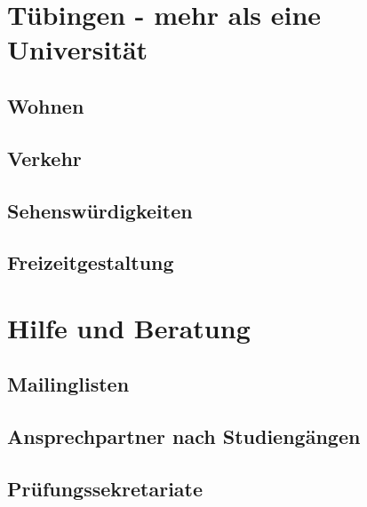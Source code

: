 \documentclass[12pt, a4paper]{article}
\newif\ifinfo
\begin{document}
\section{Tübingen - mehr als eine Universität}
\subsection{Wohnen}


\subsection{Verkehr}


\subsection{Sehenswürdigkeiten}

\pagebreak
\subsection{Freizeitgestaltung}


\newpage
\section{Hilfe und Beratung}
\ifinfo
	\subsection{Don't panic! -- Erste Hilfe: fsi}
	
\else
	
\fi 

\subsection{Mailinglisten}
\ifinfo
	
\else
	
\fi 

\ifinfo
	\subsection{Ansprechpartner nach Studiengängen}
	

	\subsection{Prüfungssekretariate}
	
\end{document}
